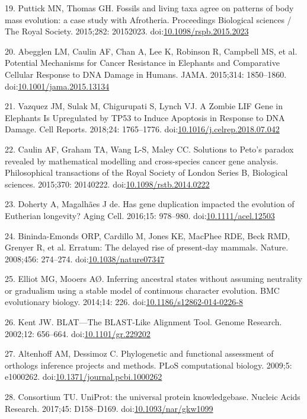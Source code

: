\documentclass[10pt,letterpaper]{article}
\begin{document}
\leavevmode\hypertarget{ref-PuttickAndThomas2015}{}%
19. Puttick MN, Thomas GH. Fossils and living taxa agree on patterns of
body mass evolution: a case study with Afrotheria. Proceedings
Biological sciences / The Royal Society. 2015;282: 20152023.
doi:\href{https://doi.org/10.1098/rspb.2015.2023}{10.1098/rspb.2015.2023}

\leavevmode\hypertarget{ref-Abegglen:JAMA2015}{}%
20. Abegglen LM, Caulin AF, Chan A, Lee K, Robinson R, Campbell MS, et
al. Potential Mechanisms for Cancer Resistance in Elephants and
Comparative Cellular Response to DNA Damage in Humans. JAMA. 2015;314:
1850--1860.
doi:\href{https://doi.org/10.1001/jama.2015.13134}{10.1001/jama.2015.13134}

\leavevmode\hypertarget{ref-Vazquez2018}{}%
21. Vazquez JM, Sulak M, Chigurupati S, Lynch VJ. A Zombie LIF Gene in
Elephants Is Upregulated by TP53 to Induce Apoptosis in Response to DNA
Damage. Cell Reports. 2018;24: 1765--1776.
doi:\href{https://doi.org/10.1016/j.celrep.2018.07.042}{10.1016/j.celrep.2018.07.042}

\leavevmode\hypertarget{ref-Caulin2015}{}%
22. Caulin AF, Graham TA, Wang L-S, Maley CC. Solutions to Peto's
paradox revealed by mathematical modelling and cross-species cancer gene
analysis. Philosophical transactions of the Royal Society of London
Series B, Biological sciences. 2015;370: 20140222.
doi:\href{https://doi.org/10.1098/rstb.2014.0222}{10.1098/rstb.2014.0222}

\leavevmode\hypertarget{ref-Doherty2016}{}%
23. Doherty A, Magalhães J de. Has gene duplication impacted the
evolution of Eutherian longevity? Aging Cell. 2016;15: 978--980.
doi:\href{https://doi.org/10.1111/acel.12503}{10.1111/acel.12503}

\leavevmode\hypertarget{ref-Bininda-Emonds2008}{}%
24. Bininda-Emonds ORP, Cardillo M, Jones KE, MacPhee RDE, Beck RMD,
Grenyer R, et al. Erratum: The delayed rise of present-day mammals.
Nature. 2008;456: 274--274.
doi:\href{https://doi.org/10.1038/nature07347}{10.1038/nature07347}

\leavevmode\hypertarget{ref-ElliotAndMooers2014}{}%
25. Elliot MG, Mooers AØ. Inferring ancestral states without assuming
neutrality or gradualism using a stable model of continuous character
evolution. BMC evolutionary biology. 2014;14: 226.
doi:\href{https://doi.org/10.1186/s12862-014-0226-8}{10.1186/s12862-014-0226-8}

\leavevmode\hypertarget{ref-blat}{}%
26. Kent JW. BLAT---The BLAST-Like Alignment Tool. Genome Research.
2002;12: 656--664.
doi:\href{https://doi.org/10.1101/gr.229202}{10.1101/gr.229202}

\leavevmode\hypertarget{ref-AltenhoffAndDessimoz2009}{}%
27. Altenhoff AM, Dessimoz C. Phylogenetic and functional assessment of
orthologs inference projects and methods. PLoS computational biology.
2009;5: e1000262.
doi:\href{https://doi.org/10.1371/journal.pcbi.1000262}{10.1371/journal.pcbi.1000262}

\leavevmode\hypertarget{ref-uniprot}{}%
28. Consortium TU. UniProt: the universal protein knowledgebase. Nucleic
Acids Research. 2017;45: D158--D169.
doi:\href{https://doi.org/10.1093/nar/gkw1099}{10.1093/nar/gkw1099}

\nolinenumbers
\end{document}
